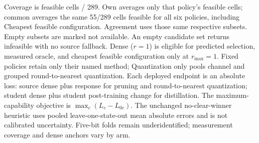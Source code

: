 \begin{table}[tb]
\begin{minipage}{\linewidth}
Coverage is feasible cells / 289. Own averages only that policy's feasible cells; common averages the same 55/289 cells feasible for all six policies, including Cheapest feasible configuration. Agreement uses those same respective subsets. Empty subsets are marked not available. An empty candidate set returns infeasible with no source fallback. Dense ($r=1$) is eligible for predicted selection, measured oracle, and cheapest feasible configuration only at $r_{\max}=1$. Fixed policies retain only their named method; Quantization only pools channel and grouped round-to-nearest quantization. Each deployed endpoint is an absolute loss: source dense plus response for pruning and round-to-nearest quantization; student dense plus student post-training change for distillation. The maximum-capability objective is $\max_c(L_c-L_{0c})$. The unchanged no-clear-winner heuristic uses pooled leave-one-state-out mean absolute errors and is not calibrated uncertainty. Five-bit folds remain underidentified; measurement coverage and dense anchors vary by arm.
\end{minipage}
\end{table}
